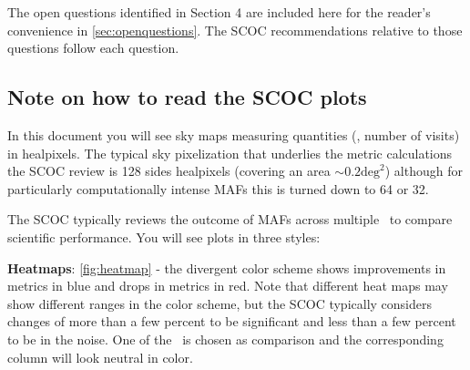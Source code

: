 The open questions identified in  Section 4  are included here for the reader's convenience in \autoref{sec:openquestions}. The SCOC recommendations relative to those questions follow each question. 



\subsection{Note on how to read the SCOC plots}

In this document you will see sky maps measuring quantities (\eg, number of visits) in healpixels. The typical sky pixelization that underlies the metric calculations the SCOC review is 128 sides healpixels (covering an area $\sim 0.2\mathrm{deg}^2$) although for particularly computationally intense MAFs this is turned down to 64 or 32.

The SCOC typically reviews the outcome of MAFs across multiple \opsim\ to compare scientific performance. You will see plots in three styles:

{\bf Heatmaps}: \autoref{fig:heatmap} -
the divergent color scheme shows improvements in metrics in blue and drops in metrics in red. Note that different heat maps may show different ranges in the color scheme, but the SCOC typically considers changes of more than a few percent to be significant and less than a few percent to be in the noise. One of the \opsim\ is chosen as comparison and the corresponding column will look neutral in color.

